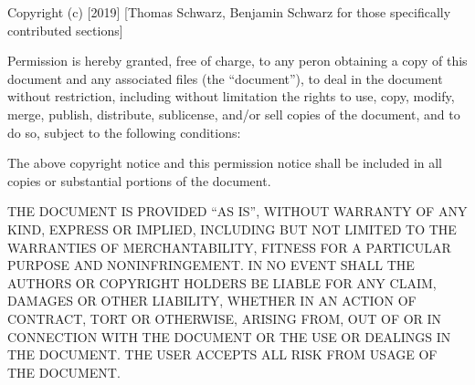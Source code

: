 \documentclass[11pt, titlepage]{article}
\begin{document}
Copyright (c) [2019] [Thomas Schwarz, Benjamin Schwarz for those specifically contributed sections]


Permission is hereby granted, free of charge, to any peron obtaining a copy of this document and any associated files (the ``document''), to deal in the document without restriction, including without limitation the rights to use, copy, modify, merge, publish, distribute, sublicense, and/or sell copies of the document, and to do so, subject to the following conditions:


The above copyright notice and this permission notice shall be included in all copies or substantial portions of the document.


THE DOCUMENT IS PROVIDED ``AS IS'', WITHOUT WARRANTY OF ANY KIND, EXPRESS OR IMPLIED, INCLUDING BUT NOT LIMITED TO THE WARRANTIES OF MERCHANTABILITY, FITNESS FOR A PARTICULAR PURPOSE AND NONINFRINGEMENT. IN NO EVENT SHALL THE AUTHORS OR COPYRIGHT HOLDERS BE LIABLE FOR ANY CLAIM, DAMAGES OR OTHER LIABILITY, WHETHER IN AN ACTION OF CONTRACT, TORT OR OTHERWISE, ARISING FROM, OUT OF OR IN CONNECTION WITH THE DOCUMENT OR THE USE OR DEALINGS IN THE DOCUMENT. THE USER ACCEPTS ALL RISK FROM USAGE OF THE DOCUMENT.
\end{document}
